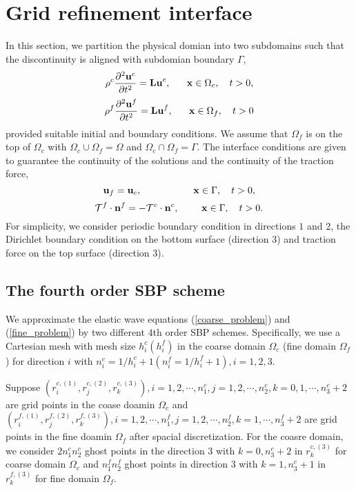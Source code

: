 \documentclass[a4paper]{article}
\begin{document}
\section{Grid refinement interface}
In this section, we partition the physical domian into two subdomains such that the discontinuity is aligned with subdomian boundary $\Gamma$,
\begin{equation}\label{coarse_problem}
\rho^c\frac{\partial ^2 {\bf u}^c}{\partial t^2} = {\bf Lu}^c, \ \ \ \ \ {\bf x} \in \Omega_c,\ \ \ t>0,
\end{equation}
\begin{equation}\label{fine_problem}
\rho^f\frac{\partial ^2 {\bf u}^f}{\partial t^2} = {\bf Lu}^f, \ \ \ \ \ {\bf x} \in \Omega_f,\ \ \ t>0
\end{equation}
provided suitable initial and boundary conditions. We assume that $\Omega_f$ is on the top of $\Omega_c$ with $\Omega_c\cup\Omega_f = \Omega$ and $\Omega_c\cap\Omega_f = \Gamma$. The interface conditions are given to guarantee the continuity of the solutions and the continuity of the traction force,
\begin{equation}\label{continuity_sol}
{\bf u}_f = {\bf u}_c, \ \ \ \ \ \ \ \ \ \ \ \ \ \ \ \ {\bf x}\in \Gamma, \ \ \ t>0, 
\end{equation}
\begin{equation}\label{continuity_trac}
\mathcal{T}^f\cdot{\bf n}^f = -\mathcal{T}^c\cdot{\bf n}^c,  \ \ \ \ \ \ \  {\bf x}\in \Gamma, \ \ \ t>0.
\end{equation}
For simplicity, we consider periodic boundary condition in directions $1$ and $2$, the Dirichlet boundary condition on the bottom surface (direction $3$) and traction force on the top surface (direction $3$).

\subsection{The fourth order SBP scheme}\label{sub_section_4_1}
We approximate the elastic wave equations (\ref{coarse_problem}) and (\ref{fine_problem}) by two different $4$th order SBP schemes. Specifically, we use a Cartesian mesh with mesh size $h_i^c (h_i^f)$ in the coarse domain $\Omega_c$ (fine domain $\Omega_f$) for direction $i$ with $n_i^c = 1/h_i^c +1 (n_i^f = 1/h_i^f +1), i = 1,2,3$.

Suppose $(r^{c,(1)}_i, r^{c,(2)}_j, r^{c,(3)}_k), i = 1,2,\cdots,n_1^c, j = 1,2,\cdots,n_2^c,k=0,1,\cdots,n_3^c+2$ are grid points in the coase doamin $\Omega_c$ and   $(r^{f,(1)}_i, r^{f,(2)}_j, r^{f,(3)}_k), i = 1,2,\cdots,n_1^f, j = 1,2,\cdots,n_2^f,k=1,\cdots,n_3^f+2$ are grid points in the fine doamin $\Omega_f$ after spacial discretization. For the coasre domain, we consider $2n^c_1n^c_2$ ghost points in the direction $3$ with $k = 0, n_3^c+2$ in $r^{c,(3)}_k$ for coarse domain $\Omega_c$ and $n^f_1n^f_2$ ghost points in direction $3$ with $k = 1,n_3^c+1$ in $r^{f,(3)}_k$ for fine domain $\Omega_f$.
\end{document}
